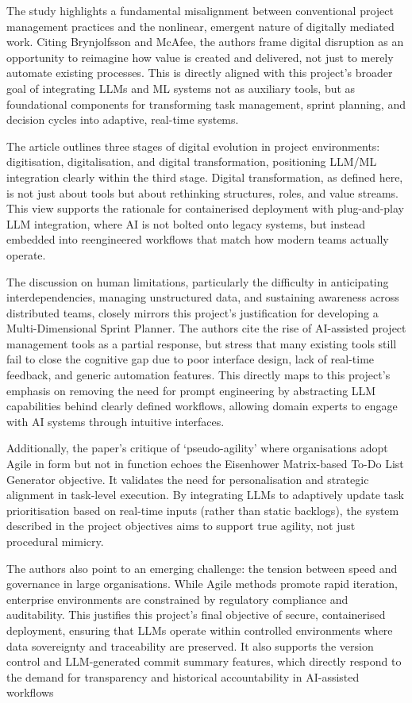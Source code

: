 \documentclass{report}
\begin{document}
The study highlights a fundamental misalignment between conventional project management practices and the nonlinear, emergent nature of digitally mediated work. 
Citing Brynjolfsson and McAfee, the authors frame digital disruption as an opportunity to reimagine how value is created and delivered, not just to merely automate existing processes. 
This is directly aligned with this project's broader goal of integrating LLMs and ML systems not as auxiliary tools, but as foundational components for transforming task management, sprint planning, and decision cycles into adaptive, real-time systems.

The article outlines three stages of digital evolution in project environments: digitisation, digitalisation, and digital transformation, positioning LLM/ML integration clearly within the third stage. 
Digital transformation, as defined here, is not just about tools but about rethinking structures, roles, and value streams. 
This view supports the rationale for containerised deployment with plug-and-play LLM integration, where AI is not bolted onto legacy systems, but instead embedded into reengineered workflows that match how modern teams actually operate.

The discussion on human limitations, particularly the difficulty in anticipating interdependencies, managing unstructured data, and sustaining awareness across distributed teams, closely mirrors this project's justification for developing a Multi-Dimensional Sprint Planner. 
The authors cite the rise of AI-assisted project management tools as a partial response, but stress that many existing tools still fail to close the cognitive gap due to poor interface design, lack of real-time feedback, and generic automation features.
This directly maps to this project's emphasis on removing the need for prompt engineering by abstracting LLM capabilities behind clearly defined workflows, allowing domain experts to engage with AI systems through intuitive interfaces.

Additionally, the paper's critique of `pseudo-agility' where organisations adopt Agile in form but not in function echoes the Eisenhower Matrix-based To-Do List Generator objective. 
It validates the need for personalisation and strategic alignment in task-level execution. 
By integrating LLMs to adaptively update task prioritisation based on real-time inputs (rather than static backlogs), the system described in the project objectives aims to support true agility, not just procedural mimicry.

The authors also point to an emerging challenge: the tension between speed and governance in large organisations. 
While Agile methods promote rapid iteration, enterprise environments are constrained by regulatory compliance and auditability. 
This justifies this project's final objective of secure, containerised deployment, ensuring that LLMs operate within controlled environments where data sovereignty and traceability are preserved. 
It also supports the version control and LLM-generated commit summary features, which directly respond to the demand for transparency and historical accountability in AI-assisted workflows
\end{document}
